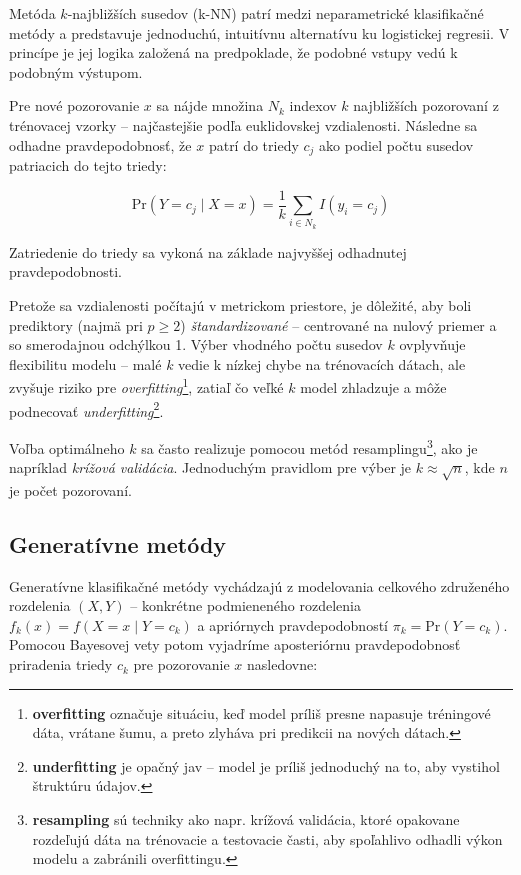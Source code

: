 Metóda $k$-najbližších susedov (k-NN) patrí medzi neparametrické klasifikačné metódy a predstavuje jednoduchú, intuitívnu alternatívu ku logistickej regresii. V princípe je jej logika založená na predpoklade, že podobné vstupy vedú k podobným výstupom.

Pre nové pozorovanie $x$ sa nájde množina $N_k$ indexov $k$ najbližších pozorovaní z trénovacej vzorky – najčastejšie podľa euklidovskej vzdialenosti. Následne sa odhadne pravdepodobnosť, že $x$ patrí do triedy $c_j$ ako podiel počtu susedov patriacich do tejto triedy:

\begin{equation}
\mathrm{Pr}(Y = c_j \mid X = x) = \frac{1}{k} \sum_{i \in N_k} I(y_i = c_j)
\end{equation}

Zatriedenie do triedy sa vykoná na základe najvyššej odhadnutej pravdepodobnosti.

Pretože sa vzdialenosti počítajú v metrickom priestore, je dôležité, aby boli prediktory (najmä pri $p \geq 2$) \textit{štandardizované} – centrované na nulový priemer a so smerodajnou odchýlkou 1. Výber vhodného počtu susedov $k$ ovplyvňuje flexibilitu modelu – malé $k$ vedie k nízkej chybe na trénovacích dátach, ale zvyšuje riziko pre \textit{overfitting}\footnote{%
\textbf{overfitting} označuje situáciu, keď model príliš presne napasuje tréningové dáta, vrátane šumu, a preto zlyháva pri predikcii na nových dátach.}, zatiaľ čo veľké $k$ model zhladzuje a môže podnecovať \textit{underfitting}\footnote{\textbf{underfitting} je opačný jav – model je príliš jednoduchý na to, aby vystihol štruktúru údajov.}.

Voľba optimálneho $k$ sa často realizuje pomocou metód resamplingu\footnote{\textbf{resampling} sú techniky ako napr. krížová validácia, ktoré opakovane rozdeľujú dáta na trénovacie a testovacie časti, aby spoľahlivo odhadli výkon modelu a zabránili overfittingu.}, ako je napríklad \textit{krížová validácia}. Jednoduchým pravidlom pre výber je $k \approx \sqrt{n}$, kde $n$ je počet pozorovaní.

\subsection{Generatívne metódy}
\label{subsec:gener_methods}

Generatívne klasifikačné metódy vychádzajú z modelovania celkového združeného rozdelenia $(X, Y)$ – konkrétne podmieneného rozdelenia $f_k(x) = f(X = x \mid Y = c_k)$ a apriórnych pravdepodobností $\pi_k = \mathrm{Pr}(Y = c_k)$. Pomocou Bayesovej vety potom vyjadríme aposteriórnu pravdepodobnosť priradenia triedy $c_k$ pre pozorovanie $x$ nasledovne:

